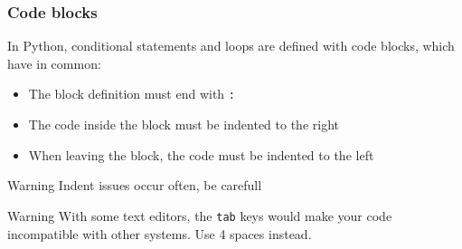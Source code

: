 \begin{frame}[fragile]
\frametitle{Code blocks}

In Python, conditional statements and loops are defined with code blocks, which have in common:

\begin{itemize}
\item{The block definition must end with \verb+:+}
\item{The code inside the block must be indented to the right}
\item{When leaving the block, the code  must be indented to the left}
\end{itemize}

\begin{alertblock}{Warning}
Indent issues occur often, be carefull
\end{alertblock}

\begin{block}{Warning}
With some text editors, the \verb+tab+ keys would make your code incompatible with other systems.
Use 4 spaces instead.
\end{block}

\end{frame}
